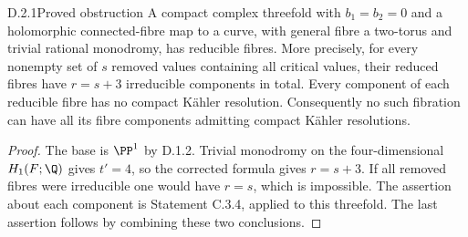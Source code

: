 \begin{idstatement}{D.2.1}{Proved obstruction}\label{st:D.2.1}
A compact complex threefold with $b_1=b_2=0$ and a holomorphic
connected-fibre map to a curve, with general fibre a two-torus and
trivial rational monodromy, has reducible fibres. More precisely,
for every nonempty set of $s$ removed values containing all critical
values, their reduced fibres have $r=s+3$ irreducible components in
total. Every component of each reducible fibre has no compact
K\"ahler resolution. Consequently no such fibration can have all
its fibre components admitting compact K\"ahler resolutions.
\end{idstatement}
\begin{proof}
The base is $\PP^1$ by D.1.2. Trivial monodromy on the
four-dimensional $H_1(F;\Q)$ gives $t'=4$, so the corrected formula
gives $r=s+3$. If all removed fibres were irreducible one would have
$r=s$, which is impossible. The assertion about each component is
Statement C.3.4, applied to this threefold. The last assertion follows
by combining these two conclusions.
\end{proof}



